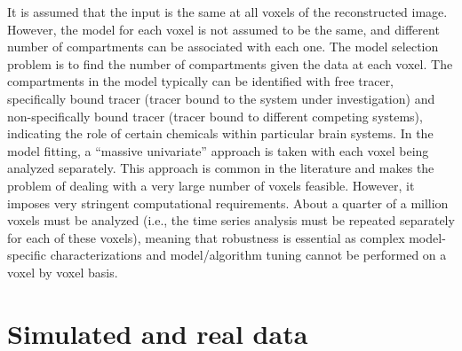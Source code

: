 It is assumed that the input is the same at all voxels of the reconstructed
image. However, the model for each voxel is not assumed to be the same, and
different number of compartments can be associated with each one. The model
selection problem is to find the number of compartments given the data at
each voxel. The compartments in the model typically can be identified with
free tracer, specifically bound tracer (tracer bound to the system under
investigation) and non-specifically bound tracer (tracer bound to different
competing systems), indicating the role of certain chemicals within
particular brain systems. In the model fitting, a ``massive univariate''
approach is taken with each voxel being analyzed separately. This approach is
common in the literature and makes the problem of dealing with a very large
number of voxels feasible. However, it imposes very stringent computational
requirements. About a quarter of a million voxels must be analyzed (i.e., the
time series analysis must be repeated separately for each of these voxels),
meaning that robustness is essential as complex model-specific
characterizations and model/algorithm tuning cannot be performed on a voxel
by voxel basis.

\section{Simulated and real \protect\pet data}
\label{sec:Simulated and real pet data}



